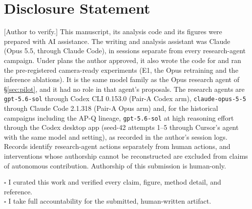 \documentclass{article}
\newcommand{\authortodo}[1]{{\color{humanframe}[#1]}}
\begin{document}
\section{Disclosure Statement}
\authortodo{Author to verify.} This manuscript, its analysis code and its figures were prepared with AI assistance. The writing and analysis assistant was Claude (Opus 5.5, through Claude Code), in sessions separate from every research-agent campaign. Under plans the author approved, it also wrote the code for and ran the pre-registered camera-ready experiments (E1, the Opus retraining and the inference ablations). It is the same model family as the Opus research agent of \S\ref{sec:pilot}, and it had no role in that agent's proposals. The research agents are \texttt{gpt-5.6-sol} through Codex CLI 0.153.0 (Pair-A Codex arm), \texttt{claude-opus-5-5} through Claude Code 2.1.318 (Pair-A Opus arm) and, for the historical campaigns including the AP-Q lineage, \texttt{gpt-5.6-sol} at high reasoning effort through the Codex desktop app (seed-42 attempts 1--5 through Cursor's agent with the same model and setting), as recorded in the author's session logs. Records identify research-agent actions separately from human actions, and interventions whose authorship cannot be reconstructed are excluded from claims of autonomous contribution. Authorship of this submission is human-only.

\noindent$\square$ I curated this work and verified every claim, figure, method detail, and reference.\\
$\square$ I take full accountability for the submitted, human-written artifact.

\clearpage


\end{document}

